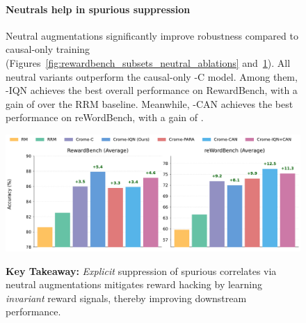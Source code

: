 \clearpage
\vspace{0.1in}
\begin{figure}[!h]
  \centering
  \begin{minipage}[t]{0.48\textwidth}
  \vspace{-0.1in}
  \paragraph{Neutrals help in spurious suppression}

Neutral augmentations significantly improve robustness compared to causal-only training (Figures~\ref{fig:rewardbench_subsets_neutral_ablations} and~\ref{fig:rewordbench-avg_neutral_ablations}). All neutral variants outperform the causal-only \carma{}-C model. Among them, \carma{}-IQN achieves the best overall performance on RewardBench, with a gain of  over the RRM baseline. Meanwhile, \carma{}-CAN achieves the best performance on reWordBench, with a gain of .


  \end{minipage}\hfill          %
  \begin{minipage}[t]{0.48\textwidth}
    \vspace{-0.15in}
    \centering
    \includegraphics[width=0.95\linewidth]{images/gemma9b_avg_benchmarks_1x2_neutral_augmentations.pdf}
    \vspace{-0.10in}
    \label{fig:rewordbench-avg_neutral_ablations}
  \end{minipage}

\vspace{0.03in}
\begin{takeawaybox}
\textbf{Key Takeaway:}  \textit{Explicit} suppression of spurious correlates via neutral augmentations mitigates reward hacking by learning \textit{invariant} reward signals, thereby improving downstream performance.
\end{takeawaybox}
\vspace{0.03in}
\end{figure}



